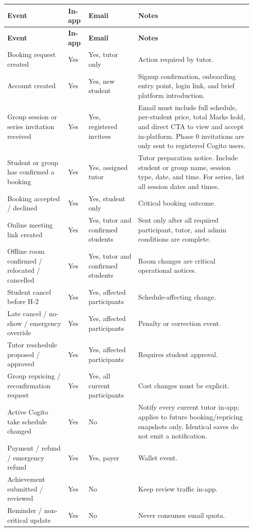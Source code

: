 \documentclass[11pt,a4paper]{article}
\begin{document}
\small
\begin{longtable}{|L{3.5cm}|L{2.0cm}|L{2.0cm}|L{6.8cm}|}
\hline
\textbf{Event} & \textbf{In-app} & \textbf{Email} & \textbf{Notes} \\
\hline
\endfirsthead
\hline
\textbf{Event} & \textbf{In-app} & \textbf{Email} & \textbf{Notes} \\
\hline
\endhead
Booking request created & Yes & Yes, tutor only & Action required by tutor. \\
\hline
Account created & Yes & Yes, new student & Signup confirmation, onboarding entry point, login link, and brief platform introduction. \\
\hline
Group session or series invitation received & Yes & Yes, registered invitees & Email must include full schedule, per-student price, total Marks hold, and direct CTA to view and accept in-platform. Phase 0 invitations are only sent to registered Cogito users. \\
\hline
Student or group has confirmed a booking & Yes & Yes, assigned tutor & Tutor preparation notice. Include student or group name, session type, date, and time. For series, list all session dates and times. \\
\hline
Booking accepted / declined & Yes & Yes, student only & Critical booking outcome. \\
\hline
Online meeting link created & Yes & Yes, tutor and confirmed students & Sent only after all required participant, tutor, and admin conditions are complete. \\
\hline
Offline room confirmed / relocated / cancelled & Yes & Yes, tutor and confirmed students & Room changes are critical operational notices. \\
\hline
Student cancel before H-2 & Yes & Yes, affected participants & Schedule-affecting change. \\
\hline
Late cancel / no-show / emergency override & Yes & Yes, affected participants & Penalty or correction event. \\
\hline
Tutor reschedule proposed / approved & Yes & Yes, affected participants & Requires student approval. \\
\hline
Group repricing / reconfirmation request & Yes & Yes, all current participants & Cost changes must be explicit. \\
\hline
Active Cogito take schedule changed & Yes & No & Notify every current tutor in-app; applies to future booking/repricing snapshots only. Identical saves do not emit a notification. \\
\hline
Payment / refund / emergency refund & Yes & Yes, payer & Wallet event. \\
\hline
Achievement submitted / reviewed & Yes & No & Keep review traffic in-app. \\
\hline
Reminder / non-critical update & Yes & No & Never consumes email quota. \\
\hline
\end{longtable}
\normalsize
\end{document}
